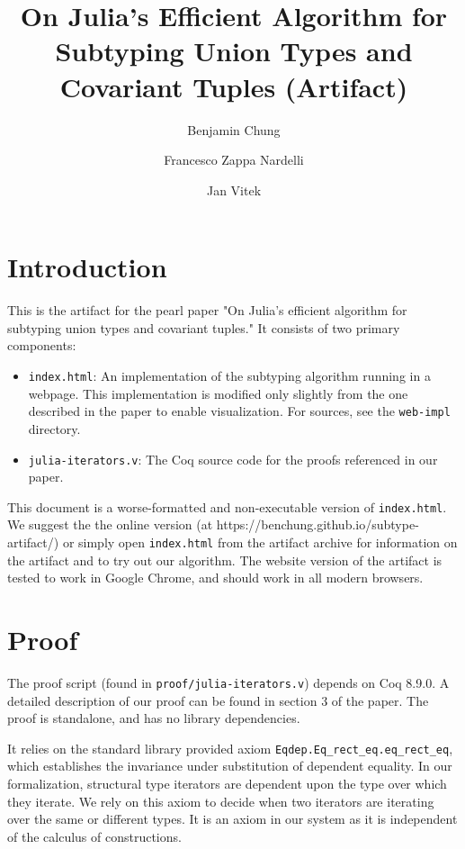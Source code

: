 \documentclass{darts-v2019}
\title{On Julia’s Efficient Algorithm for Subtyping Union Types and Covariant Tuples (Artifact)}
\author{Benjamin Chung}{Northeastern University}{bchung@ccs.neu.edu}{}{}
\author{Francesco Zappa Nardelli}{Inria}{francesco.zappa\_nardelli@inria.fr}{}{}
\author{Jan Vitek}{Northeastern University \and Czech Technical University in Prague}{j.vitek@neu.edu}{}{}
\begin{document}
\maketitle

\section{Introduction}

This is the artifact for the pearl paper "On Julia’s efficient algorithm for subtyping union types and covariant tuples." It consists of two primary components:

\begin{itemize}
\item \texttt{index.html}: An implementation of the subtyping algorithm running in a webpage. This implementation is modified only slightly from the one described in the paper to enable visualization. For sources, see the \texttt{web-impl} directory.
\item \texttt{julia-iterators.v}: The Coq source code for the proofs referenced in our paper.
\end{itemize}

This document is a worse-formatted and non-executable version of
\texttt{index.html}. We suggest the the online version (at
https://benchung.github.io/subtype-artifact/) or simply open
\texttt{index.html} from the artifact archive for information on the artifact
and to try out our algorithm. The website version of the artifact is tested to
work in Google Chrome, and should work in all modern browsers.

\section{Proof}

The proof script (found in \texttt{proof/julia-iterators.v}) depends on Coq 8.9.0. A detailed description of our 
proof can be found in section 3 of the paper. 
The proof is standalone, and has no library dependencies. 

It relies on the standard library provided axiom \verb|Eqdep.Eq_rect_eq.eq_rect_eq|, which establishes the invariance
under substitution of dependent equality. In our formalization, structural type
iterators are dependent upon the type over which they iterate. We rely on this
axiom to decide when two iterators are iterating over the same or different types.
It is an axiom in our system as it is independent of the calculus of constructions.
\end{document}

